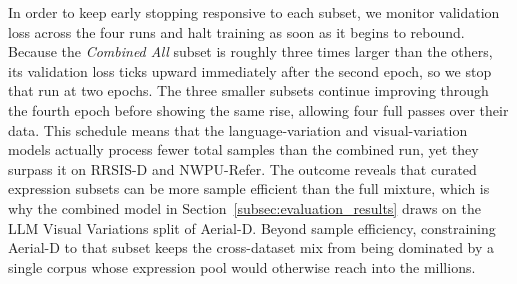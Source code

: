 \documentclass[journal]{IEEEtran}
\begin{document}
In order to keep early stopping responsive to each subset, we monitor validation loss across the four runs and halt training as soon as it begins to rebound. Because the \emph{Combined All} subset is roughly three times larger than the others, its validation loss ticks upward immediately after the second epoch, so we stop that run at two epochs. The three smaller subsets continue improving through the fourth epoch before showing the same rise, allowing four full passes over their data. This schedule means that the language-variation and visual-variation models actually process fewer total samples than the combined run, yet they surpass it on RRSIS-D and NWPU-Refer. The outcome reveals that curated expression subsets can be more sample efficient than the full mixture, which is why the combined model in Section~\ref{subsec:evaluation_results} draws on the LLM Visual Variations split of Aerial-D. Beyond sample efficiency, constraining Aerial-D to that subset keeps the cross-dataset mix from being dominated by a single corpus whose expression pool would otherwise reach into the millions.

\begin{table}[t]
\centering
\caption{Expression Enhancement Ablation Across Four Datasets}
\label{tab:ablation_expression_types}
\end{table}
\end{document}
